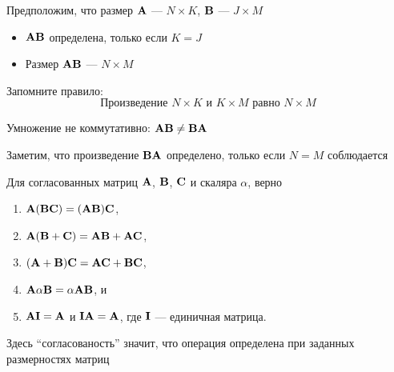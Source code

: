 \begin{frame}
    
    \vspace{2em}
    Предположим, что размер $\mathbf A$ --- $N \times K$, $\mathbf B$ --- $J \times M$
    
    \begin{itemize}
        \item $\mathbf A \mathbf B$ определена, только если $K = J$
        \item Размер $\mathbf A \mathbf B$ --- $N \times M$
    \end{itemize}
    
    \vspace{.7em}
    Запомните правило:
    \begin{equation*}
        \text{Произведение } N \times K \text{ и } K \times M
        \text{ равно }  N \times M
    \end{equation*}

    Умножение не коммутативно: $\mathbf A \mathbf B \not= \mathbf B \mathbf A$ 
    
    Заметим, что произведение $\mathbf B \mathbf A$ определено, только если $N = M$ соблюдается 

\end{frame}


\begin{frame}
    
    \vspace{2em}
    \Fact{\eqref{ET-fa:bmari}}
        Для согласованных матриц $\mathbf A$, $\mathbf B$, $\mathbf C$ и скаляра $\alpha$, верно
        \begin{enumerate}
            \item $\mathbf A (\mathbf B \mathbf C) = (\mathbf A \mathbf B) \mathbf C$,
            \item $\mathbf A (\mathbf B + \mathbf C) = \mathbf A \mathbf B + \mathbf A \mathbf C$,
            \item $(\mathbf A + \mathbf B) \mathbf C = \mathbf A \mathbf C + \mathbf B \mathbf C$,
            \item $\mathbf A \alpha \mathbf B = \alpha \mathbf A \mathbf B$, и
            \item $\mathbf A \mathbf I = \mathbf A$ и $\mathbf I \mathbf A = \mathbf A$, где
                $\mathbf I$ --- единичная матрица.
        \end{enumerate}
    
    Здесь ``согласованость'' значит, что операция определена 
    при заданных размерностях матриц

\end{frame}


